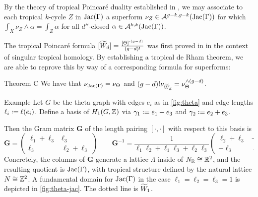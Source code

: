 \documentclass[final]{beamer}
\newlength{\colwidth}
\begin{document}
\begin{frame}[t]
\begin{columns}[t]
\begin{column}{\colwidth}
\begin{block*}
  By the theory of tropical Poincar\'e duality established in \cite{jell2019superforms,gross2023sheaf}, we may associate to each tropical $k$-cycle $Z$ in $\Jac(\Gamma)$ a superform $\nu_{Z} \in \mathcal{A}^{g-k,g-k}(\operatorname{Jac}(\Gamma))$ for which $\int_{X} \nu_{Z} \wedge \alpha = \int_{Z} \alpha$ for all $d''$-closed $\alpha \in \mathcal{A}^{k,k}(\operatorname{Jac}(\Gamma))$.

The tropical Poincar\'e formula $[\widetilde{W}_{d}] = \frac{[\Theta]^{\cdot(g-d)}}{(g-d)!}$ was first proved in \cite{gross2023tautological} in the context of singular tropical homology.  By establishing a tropical de Rham theorem, we are able to reprove this by way of a corresponding formula for superforms:
\end{block*}

\begin{alertblock}{Theorem C}
We have that $\nu_{\operatorname{Jac}(\Gamma)} = \nu_{\Theta}$ and $(g-d)!\nu_{\widetilde{W}_{d}} = \nu_{\Theta}^{\wedge(g-d)}$.
\end{alertblock}

\begin{exampleblock}{Example}
  Let $G$ be the theta graph with edges $e_{i}$ as in \cref{fig:theta} and edge lengths $\ell_{i} \defeq \ell(e_{i})$.  Define a basis of $H_{1}(G,\mathbb{Z})$ via $\gamma_{1} \defeq e_{1} + e_{3}$ and $\gamma_{2} \defeq e_{2} + e_{3}$.
\begin{figure}
  \qquad
  \subfigure[$\Jac(\Gamma)$\label{fig:theta-jac}]{}
\end{figure}
Then the Gram matrix $\mathbf{G}$ of the length pairing $[\cdot,\cdot]$ with respect to this basis is
\begin{equation}
  \mathbf{G} =
  \begin{pmatrix}
  \ell_{1} + \ell_{3} & \ell_{3} \\
  \ell_{3} & \ell_{2} + \ell_{3}
  \end{pmatrix}
  \qquad
  \mathbf{G}^{-1} = 
  \frac{1}{\ell_{1}\ell_{2} + \ell_{1}\ell_{3} + \ell_{2}\ell_{3}}
  \begin{pmatrix}
  \ell_{2} + \ell_{3} & -\ell_{3} \\
    -\ell_{3} & \ell_{1} + \ell_{3}
  \end{pmatrix}.
\end{equation}
Concretely, the columns of $\mathbf{G}$ generate a lattice $\Lambda$ inside of $N_{\mathbb{R}} \cong \mathbb{R}^{2}$, and the resulting quotient is $\Jac(\Gamma)$, with tropical structure defined by the natural lattice $N \cong \mathbb{Z}^{2}$.  A fundamental domain for $\Jac(\Gamma)$ in the case $\ell_{1} = \ell_{2} = \ell_{3} = 1$ is depicted in \cref{fig:theta-jac}.  The dotted line is $\widetilde W_{1}$.
\end{exampleblock}


\end{column}
\end{columns}
\end{frame}
\end{document}
